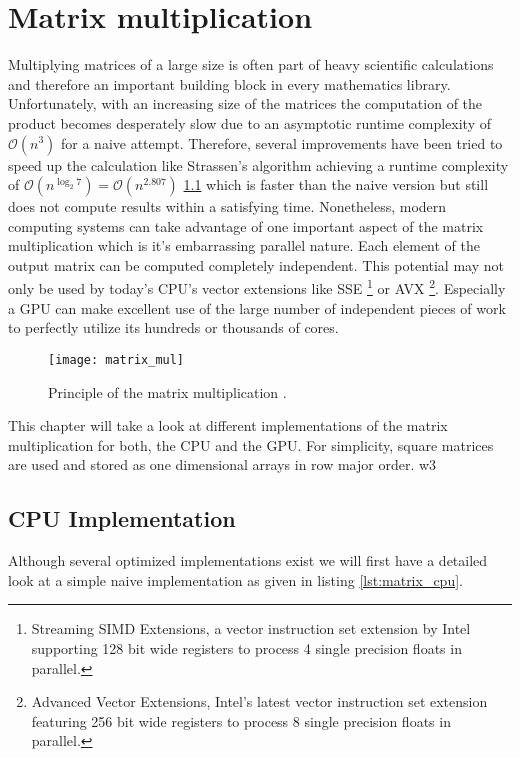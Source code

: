 \section{Matrix multiplication}

Multiplying matrices of a large size is often part of heavy scientific calculations and therefore an important building block in every mathematics library. Unfortunately, with an increasing size of the matrices the computation of the product becomes desperately slow due to an asymptotic runtime complexity of $\mathcal{O}(n^3)$ for a naive attempt. Therefore, several improvements have been tried to speed up the calculation like Strassen's algorithm achieving a runtime complexity of $\mathcal{O}(n^{\log_2 7}) = \mathcal{O}(n^{2.807})$ \ref{} which is faster than the naive version but still does not compute results within a satisfying time.
Nonetheless, modern computing systems can take advantage of one important aspect of the matrix multiplication which is it's embarrassing parallel nature. Each element of the output matrix can be computed completely independent. This potential may not only be used by today's CPU's vector extensions like SSE \footnote{Streaming SIMD Extensions, a vector instruction set extension by Intel supporting 128 bit wide registers to process 4 single precision floats in parallel.} or AVX \footnote{Advanced Vector Extensions, Intel's latest vector instruction set extension featuring 256 bit wide registers to process 8 single precision floats in parallel.}. Especially a GPU can make excellent use of the large number of independent pieces of work to perfectly utilize its hundreds or thousands of cores.

\begin{figure}
\centering
\texttt{[image: matrix\_mul]}
\caption{Principle of the matrix multiplication \cite{wiki_matrix_mul}.}
\label{fig:matrix_mul}
\end{figure}

This chapter will take a look at different implementations of the matrix multiplication for both, the CPU and the GPU. For simplicity, square matrices are used and stored as one dimensional arrays in row major order.
w3
\subsection{CPU Implementation}

Although several optimized implementations exist we will first have a detailed look at a simple naive implementation as given in listing \ref{lst:matrix_cpu}.

